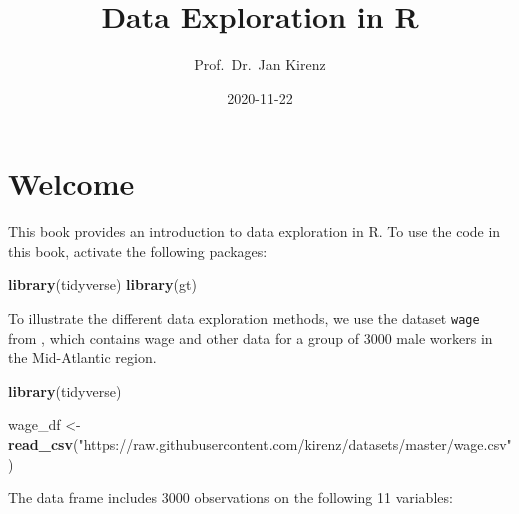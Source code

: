 \documentclass[
]{book}
\title{Data Exploration in R}
\author{Prof.~Dr.~Jan Kirenz}
\date{2020-11-22}
\newenvironment{Shaded}{\begin{snugshade}}{\end{snugshade}}
\newcommand{\KeywordTok}[1]{\textcolor[rgb]{0.13,0.29,0.53}{\textbf{#1}}}
\newcommand{\NormalTok}[1]{#1}
\newcommand{\StringTok}[1]{\textcolor[rgb]{0.31,0.60,0.02}{#1}}
\begin{document}
\maketitle

{
\setcounter{tocdepth}{1}
\tableofcontents
}
\hypertarget{welcome}{%
\chapter*{Welcome}\label{welcome}}

This book provides an introduction to data exploration in R. To use the code in this book, activate the following packages:

\begin{Shaded}
\begin{Highlighting}[]
\KeywordTok{library}\NormalTok{(tidyverse)}
\KeywordTok{library}\NormalTok{(gt)}
\end{Highlighting}
\end{Shaded}

To illustrate the different data exploration methods, we use the dataset \texttt{wage} from \citet{James2000}, which contains wage and other data for a group of 3000 male workers in the Mid-Atlantic region.

\begin{Shaded}
\begin{Highlighting}[]
\KeywordTok{library}\NormalTok{(tidyverse)}

\NormalTok{wage\_df \textless{}{-}}\StringTok{ }\KeywordTok{read\_csv}\NormalTok{(}\StringTok{"https://raw.githubusercontent.com/kirenz/datasets/master/wage.csv"}\NormalTok{)}
\end{Highlighting}
\end{Shaded}

The data frame includes 3000 observations on the following 11 variables:
\end{document}
